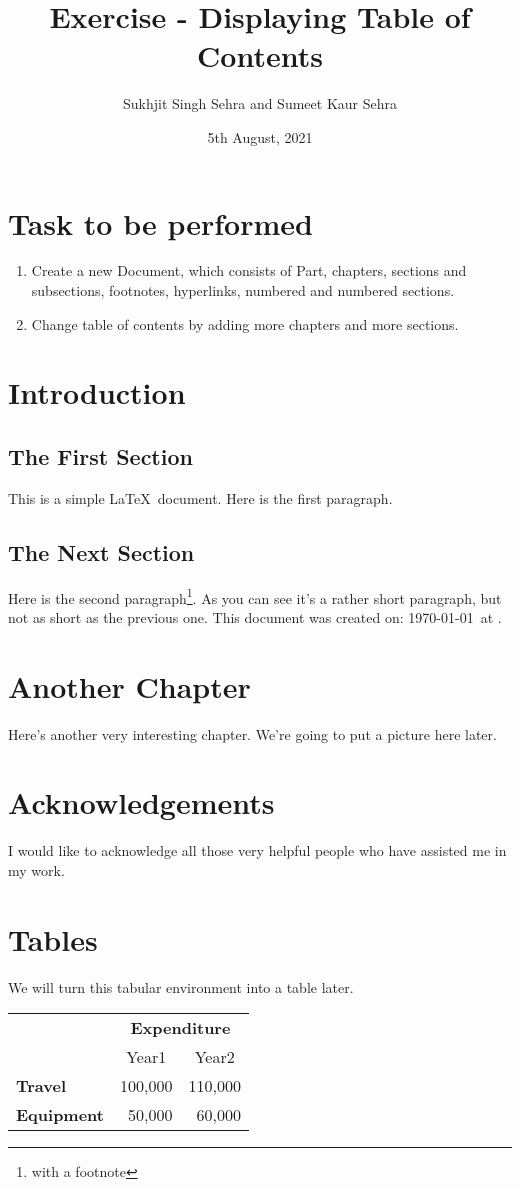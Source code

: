 \documentclass[12pt]{report}
\title{Exercise  -  Displaying Table of Contents}
\author{Sukhjit Singh Sehra and Sumeet Kaur Sehra}
\date{5th August, 2021}
\begin{document}
\maketitle

\tableofcontents


\chapter{Task to be performed}
\begin{enumerate}
	\item Create a new Document, which consists of Part, chapters, sections and subsections, footnotes, hyperlinks, numbered and numbered sections.
	\item Change table of contents by adding more chapters and more sections.
\end{enumerate}

\chapter{Introduction}

\section{The First Section}

This is a simple \LaTeX\ document.
Here is the first paragraph.

\section{The Next Section}

Here is the second paragraph\footnote{with a footnote}. 
As you can see it's a rather short paragraph, but not 
as short as the previous one. This document was 
created on: \today\ at \currenttime.

\chapter{Another Chapter}

Here's another very interesting chapter.
We're going to put a picture here later.

\chapter*{Acknowledgements}

I would like to acknowledge all those
very helpful people who have assisted
me in my work.

\appendix
\chapter{Tables}

We will turn this tabular environment into a table later.

\begin{tabular}{lrr}
 & \multicolumn{2}{c}{\bfseries Expenditure}\\
 & \multicolumn{1}{c}{Year1} & \multicolumn{1}{c}{Year2}\\
\bfseries Travel & 100,000 & 110,000\\
\bfseries Equipment & 50,000 & 60,000
\end{tabular}
\end{document}
